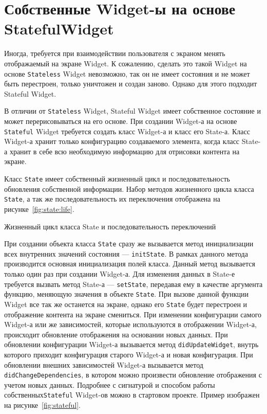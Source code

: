 \clearpage

\section{Собственные Widget-ы на основе StatefulWidget}

Иногда, требуется при взаимодействии пользователя
с экраном менять отображаемый на экране Widget.
К сожалению, сделать это такой Widget
на основе \texttt{Stateless} Widget невозможно,
так он не имеет состояния и не может быть перестроен,
только уничтожен и создан заново.
Однако для этого подходит Stateful Widget.\par
В отличии от \texttt{Stateless} Widget,
Stateful Widget имеет собственное состояние
и может перерисовываться на его основе.
При создании Widget-а на основе \texttt{Stateful} Widget
требуется создать класс Widget-а и класс его State-а.
Класс Widget-а хранит только конфигурацию создаваемого элемента,
когда класс State-а хранит в себе всю необходимую информацию
для отрисовки контента на экране.\par
Класс \texttt{State} имеет собственный жизненный цикл
и последовательность обновления собственной информации.
Набор методов жизненного цикла класса \texttt{State},
а так же последовательность их переключения отображена
на рисунке~\ref{fig:state:life}.

\begin{image}
	\caption{Жизненный цикл класса State и последовательность переключений}
	\label{fig:state:life}
\end{image}

При создании объекта класса \texttt{State}
сразу же вызывается метод инициализации
всех внутренних значений состояния --- \texttt{initState}.
В рамках данного метода производится основная инициализация полей класса.
Данный метод вызывается только один раз при создании Widget-а.
Для изменения данных в State-е требуется вызвать
метод State-а --- \texttt{setState},
передавая ему в качестве аргумента функцию,
меняющую значения в объекте \texttt{State}.
При вызове данной функции Widget все так же останется на экране,
однако его \texttt{State} будет перестроен
и отображение контента на экране смениться.
При изменении конфигурации самого Widget-а
или же зависимостей, которые используются в отображении Widget-а,
происходит обновление отображения на основании новых данных.
При обновлении конфигурации Widget-а вызывается метод \texttt{didUpdateWidget},
внутрь которого приходит конфигурация старого Widget-а и новая конфигурация.
При обновлении внешних зависимостей Widget-а
вызывается метод \texttt{didChangeDependencies},
в котором можно произвести обновление отображения с учетом новых данных.
Подробнее с сигнатурой и способом работы собственных\texttt{Stateful} 
Widget-ов можно в стартовом проекте.
Пример изображен на рисунке~\ref{fig:stateful}.

